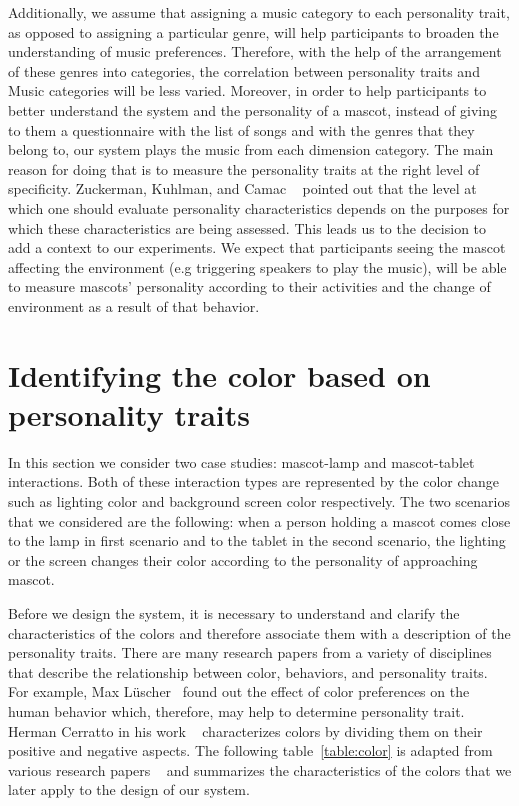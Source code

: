 \par Additionally, we assume that assigning a music category to each personality trait,
as opposed to assigning a particular genre, will help participants to broaden the understanding of music preferences.
Therefore, with the help of the arrangement of these genres into categories,
the correlation between personality traits and Music categories will be less varied.
Moreover, in order to help participants to better understand the system and the personality of a mascot,
instead of giving to them a questionnaire with the list of songs and with the genres that they
belong to, our system plays the music from each dimension category.
The main reason for doing that is to measure the personality traits at the right level of specificity.
Zuckerman, Kuhlman, and Camac ~\cite{zuckerman1988lies} pointed out that the level at which one
should evaluate personality characteristics depends on the purposes for which these characteristics are being assessed.
This leads us to the decision to add a context to our experiments.
We expect that participants seeing the mascot affecting the environment
(e.g triggering speakers to play the music), will be able to measure mascots'
personality according to their activities and the change of environment as a result of that behavior.

\section{Identifying the color based on personality traits}
\label{sec:Identifying the color based on personality traits}

In this section we consider two case studies: mascot-lamp and mascot-tablet interactions.
Both of these interaction types are represented by the color change such as
lighting color and background screen color respectively.
The two scenarios that we considered are the following: when a person holding a mascot comes close
to the lamp in first scenario and to the tablet in the second scenario, the lighting
or the screen changes their color according to the personality of approaching mascot.

Before we design the system, it is necessary to understand and clarify the characteristics
of the colors and therefore associate them with a description of the personality traits.
There are many research papers from a variety of disciplines that describe the
relationship between color, behaviors, and personality traits.
For example, Max Lüscher~\cite{luscher1971luscher} found out the effect of
color preferences on the human behavior which, therefore, may help to determine personality trait.
Herman Cerratto in his work ~\cite{cerrato2012meaning} characterizes colors by
dividing them on their positive and negative aspects.
The following table~\ref{table:color} is adapted from various research
papers ~\cite{luscher1971luscher,cerrato2012meaning,schaie1964color} and
summarizes the characteristics of the colors that we later apply to the design of our system.

